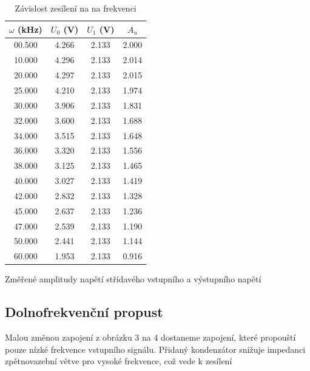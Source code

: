 \documentclass[a4paper,11pt]{article}
\begin{document}
\begin{table}[htpb]
    \begin{minipage}{.45\linewidth}
        \centering
        \begin{tabular}{| c c c c |}
            \hline
            $ \omega $  (kHz) & $ U_0 $ (V) & $ U_1 $ (V) & $ A_u $  \\
            \hline
            00.500 & 4.266 & 2.133 & 2.000 \\
            10.000 & 4.296 & 2.133 & 2.014 \\
            20.000 & 4.297 & 2.133 & 2.015 \\
            25.000 & 4.210 & 2.133 & 1.974 \\
            30.000 & 3.906 & 2.133 & 1.831 \\
            32.000 & 3.600 & 2.133 & 1.688 \\
            34.000 & 3.515 & 2.133 & 1.648 \\
            36.000 & 3.320 & 2.133 & 1.556 \\
            38.000 & 3.125 & 2.133 & 1.465 \\
            40.000 & 3.027 & 2.133 & 1.419 \\
            42.000 & 2.832 & 2.133 & 1.328 \\
            45.000 & 2.637 & 2.133 & 1.236 \\
            47.000 & 2.539 & 2.133 & 1.190 \\
            50.000 & 2.441 & 2.133 & 1.144 \\
            60.000 & 1.953 & 2.133 & 0.916 \\
            \hline
        \end{tabular}
        \caption{Změřené amplitudy napětí střídavého vstupního a výstupního napětí}
    \end{minipage} 
    \hfill
    \begin{minipage}{.45\linewidth}
        \centering
        \resizebox{\textwidth}{!}{  }
        \captionsetup{type=graph}
        \caption{Závislost zesílení na na frekvenci }
    \end{minipage} 
\end{table}

\subsection{Dolnofrekvenční propust}

Malou změnou zapojení z obrázku 3 na 4 dostaneme zapojení, které propouští pouze nízké frekvence vstupního signálu. Přidaný kondenzátor snižuje impedanci zpětnovazební větve pro vysoké frekvence, což vede k zesílení
\end{document}
